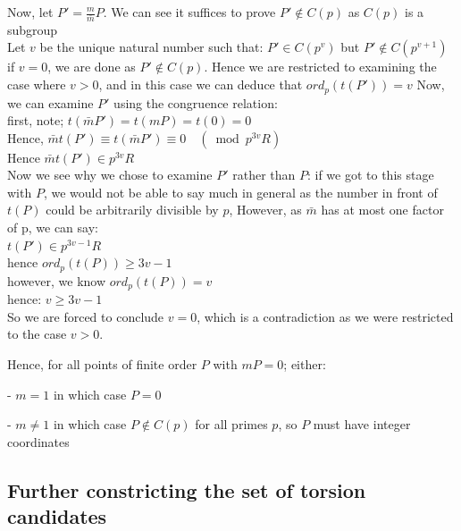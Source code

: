 \documentclass{article}
\begin{document}
Now, let $P' = \frac{m}{\bar{m}} P$. We can see it suffices to prove $P' \notin C(p)$ as $C(p)$ is a subgroup\\

Let $v$ be the unique natural number such that: $P' \in C(p^v)$ but $P' \notin C(p^{v+1})$ \\

if $v = 0$, we are done as $P' \notin C(p)$. Hence we are restricted to examining the case where $v > 0$, and in this case we can deduce that $ord_p(t(P')) = v$ Now, we can examine $P'$ using the congruence relation:\\

first, note; $t(\bar{m}P') = t(mP) = t(0) = 0$\\

Hence, $\bar{m}t(P') \equiv t(\bar{m}P') \equiv 0 \quad (\bmod{p^{3v}R})$\\

Hence $\bar{m}t(P') \in p^{3v}R$\\

Now we see why we chose to examine $P'$ rather than $P$: if we got to this stage with $P$, we would not be able to say much in general as the number in front of $t(P)$ could be arbitrarily divisible by $p$, However, as $\bar{m}$ has at most one factor of p, we can say:\\

$t(P') \in p^{3v-1}R$\\

hence $ord_p(t(P)) \geq 3v - 1$\\

however, we know $ord_p(t(P)) = v$\\

hence: $v \geq 3v - 1$\\

So we are forced to conclude $v = 0$, which is a contradiction as we were restricted to the case $v > 0$.

Hence, for all points of finite order $P$ with $mP = 0$; either:

- $m = 1$ in which case $P = 0$

- $m \neq 1$ in which case $P \notin C(p)$ for all primes $p$, so $P$ must have integer coordinates



\subsection{Further constricting the set of torsion candidates}
\end{document}
